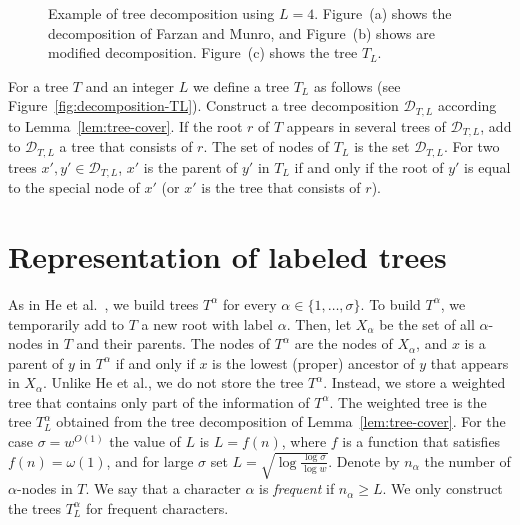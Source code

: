 \documentclass[12pt]{article}
\newcommand{\D}[2]{\mathcal{D}_{#1,#2}} \newcommand{\T}[2]{#1_{#2}} \newcommand{\V}[1]{V(#1)} \newcommand{\C}[1]{C(#1)}
\newcommand{\range}[2]{\{#1,\ldots,#2\}}
\begin{document}
\begin{figure}
\centering
\hfill
{}
\hfill
{}
\hfill
{}
\hfill\hspace*{0pt}
\caption{Example of tree decomposition using $L=4$.
Figure~(a) shows the decomposition of Farzan and Munro,
and Figure~(b) shows are modified decomposition.
Figure~(c) shows the tree $\T{T}{L}$.
}
\end{figure}

For a tree $T$ and an integer $L$ we define a tree $\T{T}{L}$ as follows
(see Figure~\ref{fig:decomposition-TL}).
Construct a tree decomposition $\D{T}{L}$ according to
Lemma~\ref{lem:tree-cover}.
If the root $r$ of $T$ appears in several trees of $\D{T}{L}$,
add to $\D{T}{L}$ a tree that consists of $r$.
The set of nodes of $\T{T}{L}$ is the set $\D{T}{L}$.
For two trees $x',y'\in\D{T}{L}$, $x'$ is the parent of $y'$ in $\T{T}{L}$
if and only if the root of $y'$ is equal to the special node of $x'$
(or $x'$ is the tree that consists of $r$).

\section{Representation of labeled trees}
As in He et al.~\cite{HeMZ12}, we build trees $T^\alpha$ for every
$\alpha\in\range{1}{\sigma}$.
To build $T^\alpha$, we temporarily add to $T$ a new root with
label $\alpha$.
Then, let $X_\alpha$ be the set of all $\alpha$-nodes in $T$ and
their parents.
The nodes of $T^\alpha$ are the nodes of $X_\alpha$, and $x$ is a parent of
$y$ in $T^\alpha$ if and only if $x$ is the lowest (proper) ancestor of $y$
that appears in $X_\alpha$.
Unlike He et al., we do not store the tree $T^\alpha$.
Instead, we store a weighted tree that contains only part of the information
of $T^\alpha$.
The weighted tree is the tree $\T{T^\alpha}{L}$ obtained from
the tree decomposition of Lemma~\ref{lem:tree-cover}.
For the case $\sigma=w^{O(1)}$ the value of $L$ is
$L=f(n)$, where $f$ is a function that satisfies $f(n)=\omega(1)$,
and for large $\sigma$ set $L=\sqrt{\log\frac{\log\sigma}{\log w}}$.
Denote by $n_\alpha$ the number of $\alpha$-nodes in $T$.
We say that a character $\alpha$ is \emph{frequent} if $n_\alpha \geq L$.
We only construct the trees $\T{T^\alpha}{L}$ for frequent characters.
\end{document}
